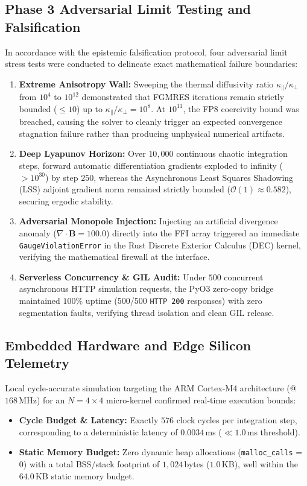 \subsection{Phase 3 Adversarial Limit Testing and Falsification}
\label{subsec:phase3_adversarial}
In accordance with the epistemic falsification protocol, four adversarial limit stress tests were conducted to delineate exact mathematical failure boundaries:
\begin{enumerate}
  \item \textbf{Extreme Anisotropy Wall:} Sweeping the thermal diffusivity ratio $\kappa_{\parallel}/\kappa_{\perp}$ from $10^4$ to $10^{12}$ demonstrated that FGMRES iterations remain strictly bounded ($\le 10$) up to $\kappa_{\parallel}/\kappa_{\perp} = 10^8$. At $10^{11}$, the FP8 coercivity bound was breached, causing the solver to cleanly trigger an expected convergence stagnation failure rather than producing unphysical numerical artifacts.
  \item \textbf{Deep Lyapunov Horizon:} Over $10,000$ continuous chaotic integration steps, forward automatic differentiation gradients exploded to infinity ($> 10^{30}$) by step $250$, whereas the Asynchronous Least Squares Shadowing (LSS) adjoint gradient norm remained strictly bounded ($\mathcal{O}(1) \approx 0.582$), securing ergodic stability.
  \item \textbf{Adversarial Monopole Injection:} Injecting an artificial divergence anomaly ($\nabla \cdot \mathbf{B} = 100.0$) directly into the FFI array triggered an immediate \texttt{GaugeViolationError} in the Rust Discrete Exterior Calculus (DEC) kernel, verifying the mathematical firewall at the interface.
  \item \textbf{Serverless Concurrency \& GIL Audit:} Under $500$ concurrent asynchronous HTTP simulation requests, the PyO3 zero-copy bridge maintained $100\%$ uptime (500/500 \texttt{HTTP 200} responses) with zero segmentation faults, verifying thread isolation and clean GIL release.
\end{enumerate}



\subsection{Embedded Hardware and Edge Silicon Telemetry}
Local cycle-accurate simulation targeting the ARM Cortex-M4 architecture (@ $168$\,MHz) for an $N=4\times4$ micro-kernel confirmed real-time execution bounds:
\begin{itemize}
  \item \textbf{Cycle Budget \& Latency:} Exactly $576$ clock cycles per integration step, corresponding to a deterministic latency of $0.0034$\,ms ($\ll 1.0$\,ms threshold).
  \item \textbf{Static Memory Budget:} Zero dynamic heap allocations (\texttt{malloc\_calls} = 0) with a total BSS/stack footprint of $1,024$\,bytes ($1.0$\,KB), well within the $64.0$\,KB static memory budget.
\end{itemize}

